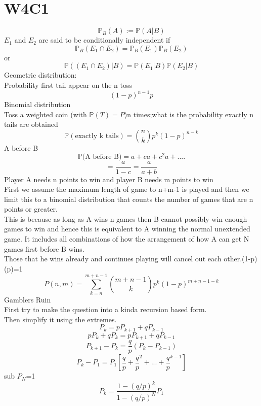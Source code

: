 \documentclass{article}
\begin{document}
\section{W4C1}
$$
\mathbb P_B(A):=\mathbb P(A|B)
$$
$E_1$ and $E_2$ are said to be conditionally independent if
$$
\mathbb P_B(E_1 \cap E_2)=\mathbb P_B(E_1)\mathbb P_B(E_2)
$$
or
$$
\mathbb P((E_1 \cap E_2)|B)=\mathbb P(E_1|B)\mathbb P(E_2|B)
$$
Geometric distribution:\\
Probability first tail appear on the n toss
$$
(1-p)^{n-1}p
$$
Binomial distribution\\
Toss a weighted coin (with $\mathbb P(T)=P$)n times;what is the probability exactly n tails are obtained
$$
\mathbb{P}(\text{exactly k tails})={n \choose k }p^k(1-p)^{n-k}
$$
A before B
$$
\mathbb P{\text{(A before B)}}=a+ca+c^2a+....
$$
$$
=\frac{a}{1-c}=\frac{a}{a+b}
$$
Player A needs n points to win and player B needs m points to win\\
First we assume the maximum length of game to n+m-1 is played and then we limit this to a binomial distribution that counts the number of games that are n points or greater.\\
This is because as long as A wins n games then B cannot possibly win enough games to win and hence this is equivalent to A winning the normal unextended game. It includes all combinations of how the arrangement of how A can get N games first before B wins.\\
Those that he wins already and continues playing will cancel out each other.(1-p)(p)=1\\
$$
P(n,m)=\sum_{k=n}^{m+n-1}{m+n-1 \choose k}p^k(1-p)^{m+n-1-k}
$$
Gamblers Ruin\\
First try to make the question into a kinda recursion based form.\\
Then simplify it using the extremes.
$$
P_k=pP_{k+1}+qP_{k-1}
$$
$$
pP_k+qP_k=pP_{k+1}+qP_{k-1}
$$
$$
P_{k+1}-P_k=\frac{q}{p}(P_k-P_{k-1})
$$
$$
P_k-P_1=P_1[\frac{q}{p}+\frac{q}{p}^2+...+\frac{q}{p}^{k-1}]
$$
sub $P_N$=1
$$
P_k=\frac{1-(q/p)^k}{1-(q/p)^N}P_1
$$
\end{document}
